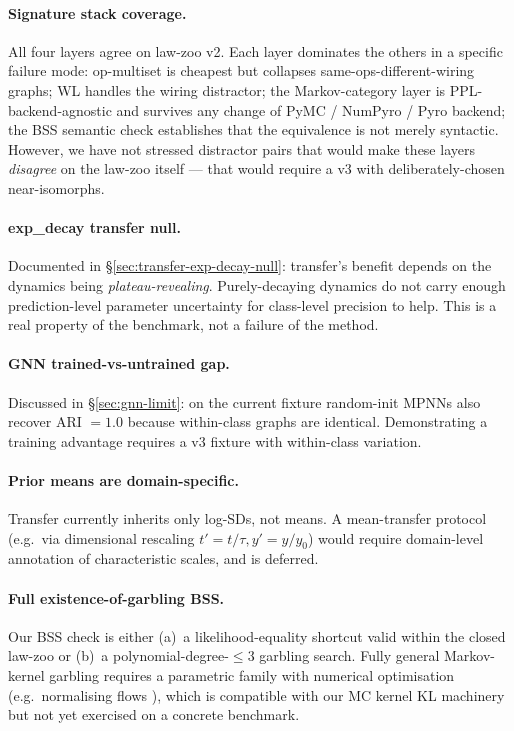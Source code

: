 \documentclass{article}
\begin{document}
\paragraph{Signature stack coverage.} All four layers agree on
law-zoo v2. Each layer dominates the others in a specific failure
mode: op-multiset is cheapest but collapses same-ops-different-wiring
graphs; WL handles the wiring distractor; the Markov-category layer is
PPL-backend-agnostic and survives any change of PyMC /
NumPyro / Pyro backend; the BSS semantic check establishes that the
equivalence is not merely syntactic. However, we have not stressed
distractor pairs that would make these layers \emph{disagree} on the
law-zoo itself --- that would require a v3 with deliberately-chosen
near-isomorphs.

\paragraph{exp\_decay transfer null.} Documented in
\S\ref{sec:transfer-exp-decay-null}: transfer's benefit depends on the
dynamics being \emph{plateau-revealing}. Purely-decaying dynamics
do not carry enough prediction-level parameter uncertainty for
class-level precision to help. This is a real property of the
benchmark, not a failure of the method.

\paragraph{GNN trained-vs-untrained gap.} Discussed in
\S\ref{sec:gnn-limit}: on the current fixture random-init MPNNs also
recover ARI $= 1.0$ because within-class graphs are identical.
Demonstrating a training advantage requires a v3 fixture with
within-class variation.

\paragraph{Prior means are domain-specific.} Transfer currently
inherits only log-SDs, not means. A mean-transfer protocol (e.g.\ via
dimensional rescaling $t' = t/\tau, y' = y/y_{0}$) would require
domain-level annotation of characteristic scales, and is deferred.

\paragraph{Full existence-of-garbling BSS.} Our BSS check is either
(a)~a likelihood-equality shortcut valid within the closed law-zoo or
(b)~a polynomial-degree-$\leq 3$ garbling search. Fully general
Markov-kernel garbling requires a parametric family with numerical
optimisation (e.g.\ normalising flows \citep{rezende2015flows}),
which is compatible with our MC kernel KL machinery but not yet
exercised on a concrete benchmark.
\end{document}

